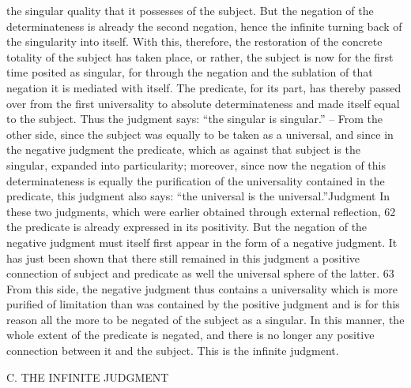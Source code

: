 the singular quality that it possesses of the subject. But the negation of the
determinateness is already the second negation, hence the infinite turning
back of the singularity into itself. With this, therefore, the restoration of
the concrete totality of the subject has taken place, or rather, the subject
is now for the first time posited as singular, for through the negation and
the sublation of that negation it is mediated with itself. The predicate,
for its part, has thereby passed over from the first universality to absolute
determinateness and made itself equal to the subject. Thus the judgment
says: “the singular is singular.” – From the other side, since the subject
was equally to be taken as a universal, and since in the negative judgment
the predicate, which as against that subject is the singular, expanded into
particularity; moreover, since now the negation of this determinateness is
equally the purification of the universality contained in the predicate, this
judgment also says: “the universal is the universal.”Judgment
In these two judgments, which were earlier obtained through external
reflection, 62 the predicate is already expressed in its positivity. But the
negation of the negative judgment must itself first appear in the form of a
negative judgment. It has just been shown that there still remained in this
judgment a positive connection of subject and predicate as well the universal
sphere of the latter. 63 From this side, the negative judgment thus contains
a universality which is more purified of limitation than was contained by
the positive judgment and is for this reason all the more to be negated of
the subject as a singular. In this manner, the whole extent of the predicate
is negated, and there is no longer any positive connection between it and
the subject. This is the infinite judgment.

C. THE INFINITE JUDGMENT

